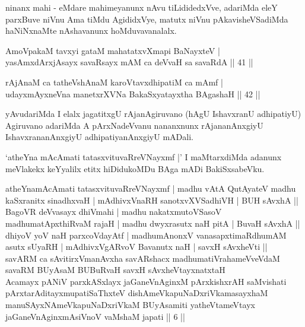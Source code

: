 \begin{artha}
ninanx mahi - eMdare mahimeyanunx nAvu tiLididedxVve, adariMda eleY parxBuve niVnu Ama tiMdu AgididxVye, matutx niVnu pAkavisheVSadiMda haNiNxnaMte nAshavanunx hoMduvavanalalx.
\end{artha}

\begin{shl}
AmoV\s pakaM tavxyi gataM mahatatxvXmapi BaNayxteV | \\
yasAmxdArxjA\s sayx savaRsayx mAM ca deVvaH sa savaRdA \hfill|| 41 || 
\end{shl}

\begin{shl}
rAjAnaM ca tatheVshAnaM karoVtavxdhipatiM ca mAmf | \\
udayxmAyxneVna manetxrXVNa BakaSxyatayxtha BAgashaH \hfill|| 42 || 
\end{shl}

\begin{artha}
yAvudariMda I elalx jagatitxgU rAjanAgiruvano (hAgU IshavxranU adhipatiyU) Agiruvano adariMda A pArxNadeVvanu nananxnunx rAjananAnxgiyU IshavxrananAnxgiyU adhipatiyanAnxgiyU mADali.
\end{artha}

\begin{artha}
`atheYna mAcAmati tatasxvituvaRreVNayxmf |' I maMtarxdiMda adanunx meVlakekx keYyalilx etitx hiDidukoMDu BAga mADi BakiSxsabeVku.
\end{artha}


\begin{kandikeshl}
atheYnamAcAmati tatasxvituvaRreVNayxmf | madhu vAtA QutAyateV madhu kaSxranitx sinadhxvaH | mAdhivxVnaRH sanotxvXVSadhiVH | BUH sAvxhA ||\\
BagoVR deVvasayx dhiVmahi | madhu nakatxmutoVSasoV madhumatApxthiRvaM rajaH | madhu dwyxrasutx naH pitA | BuvaH sAvxhA ||\\
dhiyoV yoV naH parxcoVdayAtf | madhumAnonxV vanasapxtimaRdhumAM asutx sUyaRH | mAdhivxVgARvoV Bavanutx naH | savxH sAvxheVti ||\\
savARM ca sAvitirxVmanAvxha savARshacx madhumatiVrahameVveVdaM savaRM BUyAsaM BUBuRvaH savxH sAvxheVtayxnatxtaH\\
Acamayx pANiV parxkASxlayx jaGaneVnAginxM pArxkishxrAH saMvishati pArxtarAditayxmupatiSaThxteV dishAmeVkapuNaDxriVkamasayxhaM \\
manuSAyxNAmeVkapuNaDxriVkaM BUyAsamiti yatheVtameVtayx jaGaneVnAginxmAsiVnoV vaMshaM japati || 6 ||
\end{kandikeshl}	


